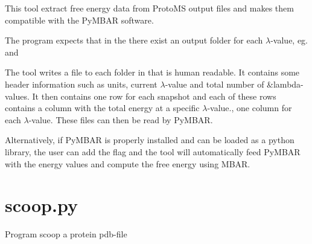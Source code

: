 \documentclass[letterpaper,10pt,english]{sphinxmanual}
\begin{document}
%
\begin{sphinxVerbatim}[commandchars=\\\{\}]
  
  
  
   
\end{sphinxVerbatim}


This tool extract free energy data from ProtoMS output files and makes them compatible with the PyMBAR software.

The program expects that in the  there exist an output folder for each \(\lambda\)-value, eg.  and 

The tool writes a file  to each folder in  that is human readable. It contains some header information such as units, current \(\lambda\)-value and total number of \&lambda-values. It then contains one row for each snapshot and each of these rows contains a column with the total energy at a specific \(\lambda\)-value., one column for each \(\lambda\)-value. These files can then be read by PyMBAR.

Alternatively, if PyMBAR is properly installed and can be loaded as a python library, the user can add the  flag and the tool will automatically feed PyMBAR with the energy values and compute the free energy using MBAR.


\section{scoop.py}
\label{\detokenize{tools:scoop-py}}

Program scoop a protein pdb-file
\end{document}
